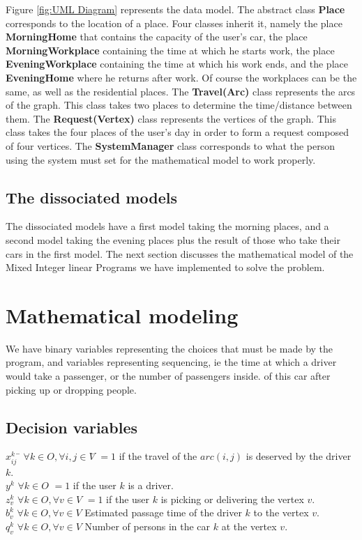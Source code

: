 \documentclass[12pt, a4paper,twoside]{memoir}
\newcommand{\newpar}{\vskip 0.2in \noindent}
\newcommand\tab[1][1cm]{\hspace*{#1}}
\begin{document}
	\noindent Figure \ref{fig:UML Diagram} represents the data model. \newline
	The abstract class \textbf{Place} corresponds to the location of a place. Four classes inherit it, namely the place \textbf{MorningHome} that contains the capacity of the user's car, the place \textbf{MorningWorkplace} containing the time at which he starts work, the place \textbf{EveningWorkplace} containing the time at which his work ends, and the place \textbf{EveningHome} where he returns after work. Of course the workplaces can be the same, as well as the residential places. The \textbf{Travel(Arc)} class represents the arcs of the graph. This class takes two places to determine the time/distance between them. The \textbf{Request(Vertex)} class represents the vertices of the graph. This class takes the four places of the user's day in order to form a request composed of four vertices. The \textbf{SystemManager} class corresponds to what the person using the system must set for the mathematical model to work properly.
	
	\subsection{The dissociated models}
	
	The dissociated models have a first model taking the morning places, and a second model taking the evening places plus the result of those who take their cars in the first model.
	\newpar
	The next section discusses the mathematical model of the Mixed Integer linear Programs we have implemented to solve the problem.
	
	\section{Mathematical modeling}
	
	We have binary variables representing the choices that must be made by the program, and variables representing sequencing, ie the time at which a driver would take a passenger, or the number of passengers inside. of this car after picking up or dropping people.
	
	\subsection{Decision variables}
	\begin{tabbing}
		$x^{k}_{ij}$ \tab \= $\forall k\in O,\forall i,j\in V$\tab \= $=1$ if the travel of the $arc(i,j)$ is deserved by the driver $k$. \\
		$y^{k}$ \> $\forall k\in O$ \> $=1$ if the user $k$ is a driver. \\
		$z^{k}_{v}$ \> $\forall k\in O,\forall v\in V$ \> $=1$ if the user $k$ is picking or delivering the vertex $v$. \\
		$b^{k}_{v}$ \> $\forall k\in O,\forall v\in V$ \> Estimated passage time of the driver $k$ to the vertex $v$. \\
		$q^{k}_{v}$ \> $\forall k\in O,\forall v\in V$ \> Number of persons in the car $k$ at the vertex $v$. \\
	\end{tabbing}
	
\end{document}
